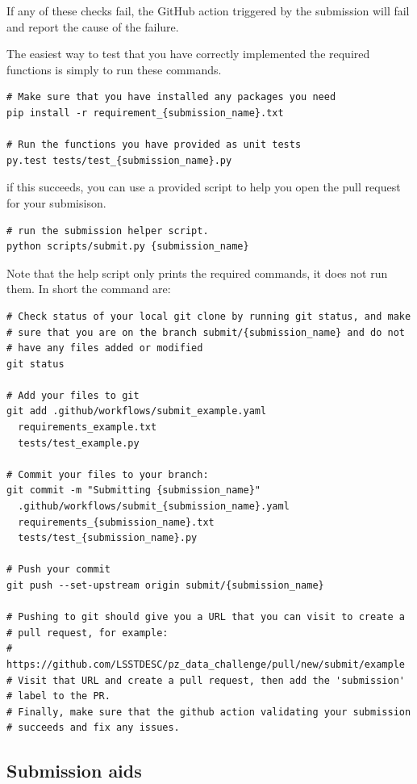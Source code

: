 If any of these checks fail, the GitHub action triggered by the
submission will fail and report the cause of the failure.

The easiest way to test that you have correctly implemented the
required functions is simply to run these commands.

\begin{verbatim}
# Make sure that you have installed any packages you need
pip install -r requirement_{submission_name}.txt

# Run the functions you have provided as unit tests
py.test tests/test_{submission_name}.py
\end{verbatim}

if this succeeds, you can use a provided script to help you open the
pull request for your submisison.

\begin{verbatim}
# run the submission helper script.
python scripts/submit.py {submission_name}
\end{verbatim}

Note that the help script only prints the required commands, it does
not run them.  In short the command are:

\begin{verbatim}
# Check status of your local git clone by running git status, and make
# sure that you are on the branch submit/{submission_name} and do not
# have any files added or modified
git status

# Add your files to git
git add .github/workflows/submit_example.yaml
  requirements_example.txt
  tests/test_example.py

# Commit your files to your branch: 
git commit -m "Submitting {submission_name}"
  .github/workflows/submit_{submission_name}.yaml
  requirements_{submission_name}.txt
  tests/test_{submission_name}.py

# Push your commit
git push --set-upstream origin submit/{submission_name}

# Pushing to git should give you a URL that you can visit to create a
# pull request, for example:
#   https://github.com/LSSTDESC/pz_data_challenge/pull/new/submit/example
# Visit that URL and create a pull request, then add the 'submission'
# label to the PR.
# Finally, make sure that the github action validating your submission
# succeeds and fix any issues.
\end{verbatim}


\subsection{Submission aids}


